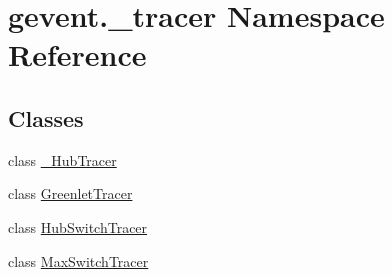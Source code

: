 \hypertarget{namespacegevent_1_1__tracer}{}\section{gevent.\+\_\+tracer Namespace Reference}
\label{namespacegevent_1_1__tracer}
\subsection*{Classes}
\begin{DoxyCompactItemize}
\item 
class \hyperlink{classgevent_1_1__tracer_1_1___hub_tracer}{\+\_\+\+Hub\+Tracer}
\item 
class \hyperlink{classgevent_1_1__tracer_1_1_greenlet_tracer}{Greenlet\+Tracer}
\item 
class \hyperlink{classgevent_1_1__tracer_1_1_hub_switch_tracer}{Hub\+Switch\+Tracer}
\item 
class \hyperlink{classgevent_1_1__tracer_1_1_max_switch_tracer}{Max\+Switch\+Tracer}
\end{DoxyCompactItemize}
